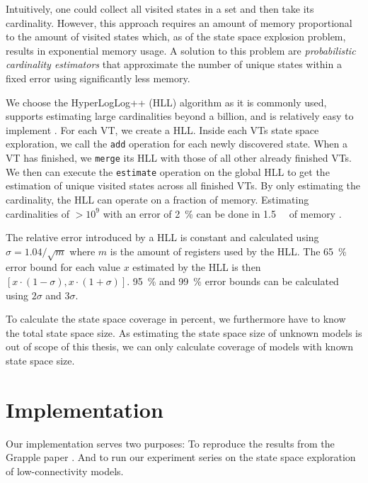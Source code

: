 \documentclass[
fancyheadings, %
%
%
]{stsreprt}
\begin{document}
Intuitively, one could collect all visited states in a set and then take its cardinality.
However, this approach requires an amount of memory proportional to the amount of visited states which, as of the state space explosion problem, results in exponential memory usage.
A solution to this problem are \emph{probabilistic cardinality estimators} that approximate the number of unique states within a fixed error using significantly less memory.

We choose the HyperLogLog++ (HLL) algorithm as it is commonly used, supports estimating large cardinalities beyond a billion, and is relatively easy to implement \cite{Heule2013.HyperLogLog++}.
For each VT, we create a HLL.
Inside each VTs state space exploration, we call the \texttt{add} operation for each newly discovered state.
When a VT has finished, we \texttt{merge} its HLL with those of all other already finished VTs.
We then can execute the \texttt{estimate} operation on the global HLL to get the estimation of unique visited states across all finished VTs.
By only estimating the cardinality, the HLL can operate on a fraction of memory.
Estimating cardinalities of $> 10^9$ with an error of \SI{2}{\percent} can be done in \SI{1.5}{\kilo\byte} of memory \cite{Flajolet2007.HyperLogLog}.

The relative error introduced by a HLL is constant and calculated using $\sigma=1.04 / \sqrt{m}$ where $m$ is the amount of registers used by the HLL.
The \SI{65}{\percent} error bound for each value $x$ estimated by the HLL is then $\left[x \cdot (1-\sigma), x \cdot (1+\sigma)\right]$.
\SI{95}{\percent} and \SI{99}{\percent} error bounds can be calculated using $2\sigma$ and $3\sigma$.

To calculate the state space coverage in percent, we furthermore have to know the total state space size.
As estimating the state space size of unknown models is out of scope of this thesis, we can only calculate coverage of models with known state space size.

\chapter{Implementation}

Our implementation serves two purposes:
To reproduce the results from the Grapple paper \cite{DeFrancisco2020.Grapple}.
And to run our experiment series on the state space exploration of low-connectivity models.
\end{document}
